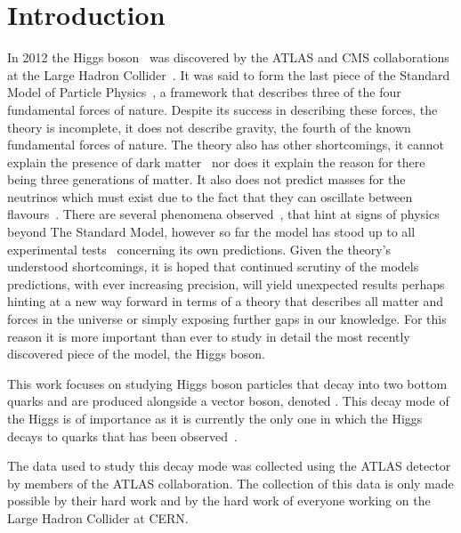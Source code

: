 \chapter{Introduction}%
\label{ch:intro}

In 2012 the Higgs boson~\cite{Brout-Englert, Higgs:1964, Kibble} was discovered
by the ATLAS and CMS collaborations at the Large Hadron
Collider~\cite{DiscoHiggsATLAS, DiscoHiggsCMS}. It was said to form the last
piece of the Standard Model of Particle Physics~\cite{Glashow:1959, Salam:1968,
Weinberg:1967, GellMann:1962}, a framework that describes three of the four
fundamental forces of nature. Despite its success in describing these forces,
the theory is incomplete, it does not describe gravity, the fourth of the known
fundamental forces of nature. The theory also has other shortcomings, it cannot
explain the presence of dark matter~\cite{DM-ev-sloan, DM-ev-nucleosynth,
  DM-ev-supernova, DM-ev-scaffold, DM-ev-direct, DM-ev-strong-lens,
  DM-ev-candidates, DM-ev-PDG, DM-ev-Zwicky, DM-ev-nonbaryonic, DM-ev-particle}
nor does it explain the reason for there being three generations of matter. It
also does not predict masses for the neutrinos which must exist due to the fact
that they can oscillate between flavours~\cite{nu-osc-1, nu-osc-2, nu-osc-3}.
There are several phenomena observed~\cite{anom-BD-branching, anom-Dtau-excess,
  anom-g-2, anom-proton-radius, anom-bsll-trans}, that hint at signs of physics
beyond The Standard Model, however so far the model has stood up to all
experimental tests~\cite{EWtests, 1998-SMtests} concerning its own predictions.
Given the theory's understood shortcomings, it is hoped that continued
scrutiny of the models predictions, with ever increasing precision, will yield
unexpected results perhaps hinting at a new way forward in terms of a theory
that describes all matter and forces in the universe or simply exposing further
gaps in our knowledge. For this reason it is more important than ever to study
in detail the most recently discovered piece of the model, the Higgs boson.

This work focuses on studying Higgs boson particles that decay into two bottom
quarks and are produced alongside a vector boson, denoted \VHbb. This decay mode
of the Higgs is of importance as it is currently the only one in which the Higgs
decays to quarks that has been observed~\cite{vhbb-obs}.

The data used to study this decay mode was collected using the ATLAS detector by
members of the ATLAS collaboration. The collection of this data is only made
possible by their hard work and by the hard work of everyone working on the
Large Hadron Collider at CERN.

